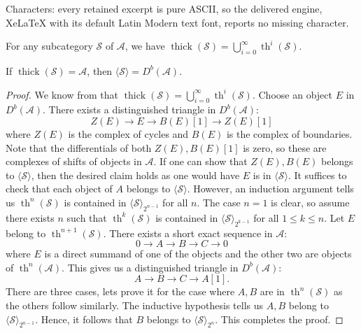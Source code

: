 \documentclass[10pt,a4paper]{amsart}
\begin{document}
Characters: every retained excerpt is pure ASCII, so the delivered engine, XeLaTeX with its default Latin Modern text font, reports no missing character.
\begin{lemma}\label{lem:thick_abelian_filtration}
    For any subcategory $\mathcal{S}$ of $\mathcal{A}$, we have $\operatorname{thick}(\mathcal{S})= \bigcup^\infty_{i=0} \operatorname{th}^i (\mathcal{S})$.
\end{lemma}

\begin{lemma}\label{lem:abelian_thick_to_bounded_derived_thick}
    If $\operatorname{thick}(\mathcal{S})=\mathcal{A}$, then $\langle \mathcal{S} \rangle = D^b(\mathcal{A})$.
\end{lemma}

\begin{proof}
    We know from  that $\operatorname{thick}(\mathcal{S})= \bigcup^\infty_{i=0} \operatorname{th}^i (\mathcal{S})$. Choose an object $E$ in $D^b (\mathcal{A})$. There exists a distinguished triangle in $D^b (\mathcal{A})$:
    \begin{displaymath}
        Z(E) \to E \to B(E)[1] \to Z(E)[1]
    \end{displaymath}
    where $Z(E)$ is the complex of cycles and $B(E)$ is the complex of boundaries. Note that the differentials of both $Z(E),B(E)[1]$ is zero, so these are complexes of shifts of objects in $\mathcal{A}$. If one can show that $Z(E),B(E)$ belongs to $\langle \mathcal{S} \rangle$, then the desired claim holds as one would have $E$ is in $\langle \mathcal{S} \rangle$. It suffices to check that each object of $A$ belongs to $\langle \mathcal{S} \rangle$. However, an induction argument tells us $\operatorname{th}^n (\mathcal{S})$ is contained in $\langle \mathcal{S} \rangle_{2^{n-1}}$ for all $n$. The case $n=1$ is clear, so assume there exists $n$ such that $\operatorname{th}^k (\mathcal{S})$ is contained in $\langle \mathcal{S} \rangle_{2^{k-1}}$ for all $1\leq k \leq n$. Let $E$ belong to $\operatorname{th}^{n+1} (\mathcal{S})$. There exists a short exact sequence in $\mathcal{A}$:
    \begin{displaymath}
        0 \to A \to B \to C \to 0
    \end{displaymath}
    where $E$ is a direct summand of one of the objects and the other two are objects of $\operatorname{th}^n (\mathcal{A})$. This gives us a distinguished triangle in $D^b (\mathcal{A})$:
    \begin{displaymath}
        A \to B \to C \to A[1].
    \end{displaymath}
    There are three cases, lets prove it for the case where $A,B$ are in $\operatorname{th}^n (\mathcal{S})$ as the others follow similarly. The inductive hypothesis tells us $A,B$ belong to $\langle \mathcal{S} \rangle_{2^{n-1}}$. Hence, it follows that $B$ belongs to $\langle \mathcal{S} \rangle_{2^n}$. This completes the proof.
\end{proof}
\end{document}
